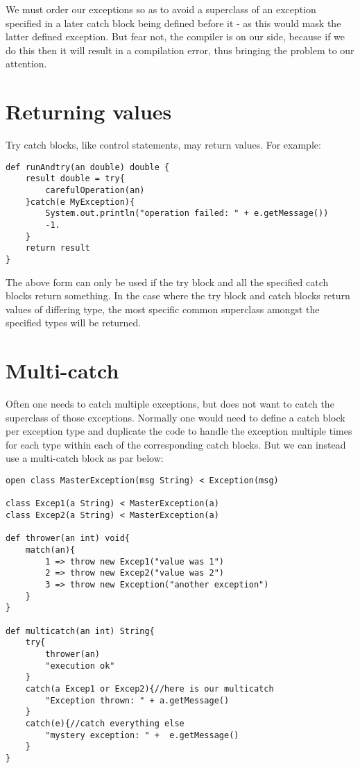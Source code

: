 \documentclass[conc-doc]{subfiles}
\begin{document}
We must order our exceptions so as to avoid a superclass of an exception specified in a later catch block being defined before it - as this would mask the latter defined exception. But fear not, the compiler is on our side, because if we do this then it will result in a compilation error, thus bringing the problem to our attention.

\section{Returning values}
Try catch blocks, like control statements, may return values. For example:

\begin{lstlisting}
def runAndtry(an double) double {
	result double = try{
		carefulOperation(an)
	}catch(e MyException){
		System.out.println("operation failed: " + e.getMessage())
		-1.
	}
	return result
}
\end{lstlisting}

The above form can only be used if the try block and all the specified catch blocks return something. In the case where the try block and catch blocks return values of differing type, the most specific common superclass amongst the specified types will be returned.

\section{Multi-catch}
Often one needs to catch multiple exceptions, but does not want to catch the superclass of those exceptions. Normally one would need to define a catch block per exception type and duplicate the code to handle the exception multiple times for each type within each of the corresponding catch blocks. But we can instead use a multi-catch block as par below:

\begin{lstlisting}
open class MasterException(msg String) < Exception(msg)

class Excep1(a String) < MasterException(a)
class Excep2(a String) < MasterException(a)

def thrower(an int) void{
	match(an){
		1 => throw new Excep1("value was 1")
		2 => throw new Excep2("value was 2")
		3 => throw new Exception("another exception")
	}
}

def multicatch(an int) String{
	try{
		thrower(an)
		"execution ok"
	}
	catch(a Excep1 or Excep2){//here is our multicatch
		"Exception thrown: " + a.getMessage()
	}
	catch(e){//catch everything else
		"mystery exception: " +  e.getMessage()
	}
}
\end{lstlisting}
\end{document}
